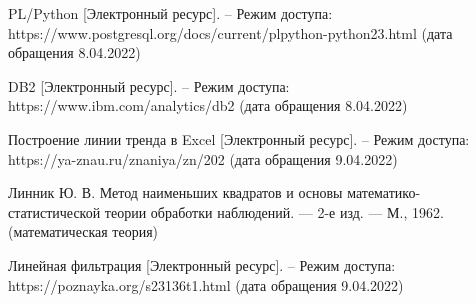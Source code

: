 \documentclass[a4paper,14pt]{extreport}
\begin{document}
\begin{thebibliography}{3}
	 PL/Python [Электронный ресурс]. -- Режим доступа: https://www.postgresql.org/docs/current/plpython-python23.html (дата обращения 8.04.2022)
	
	 DB2 [Электронный ресурс]. -- Режим доступа: https://www.ibm.com/analytics/db2 (дата обращения 8.04.2022)
	
	 Построение линии тренда в Excel [Электронный ресурс]. -- Режим доступа: https://ya-znau.ru/znaniya/zn/202 (дата обращения 9.04.2022)
	
	 Линник Ю. В. Метод наименьших квадратов и основы математико-статистической теории обработки наблюдений. — 2-е изд. — М., 1962. (математическая теория)
	
	 Линейная фильтрация [Электронный ресурс]. -- Режим доступа: https://poznayka.org/s23136t1.html (дата обращения 9.04.2022)
\end{thebibliography}
	
\end{document}
